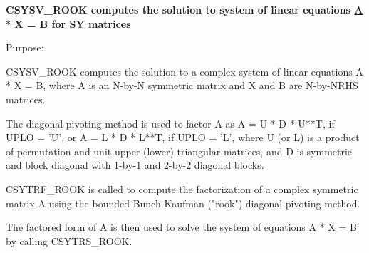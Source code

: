 {\bfseries  C\+S\+Y\+S\+V\+\_\+\+R\+O\+O\+K computes the solution to system of linear equations \hyperlink{classA}{A} $\ast$ X = B for S\+Y matrices} 

 \begin{DoxyParagraph}{Purpose\+: }
\begin{DoxyVerb} CSYSV_ROOK computes the solution to a complex system of linear
 equations
    A * X = B,
 where A is an N-by-N symmetric matrix and X and B are N-by-NRHS
 matrices.

 The diagonal pivoting method is used to factor A as
    A = U * D * U**T,  if UPLO = 'U', or
    A = L * D * L**T,  if UPLO = 'L',
 where U (or L) is a product of permutation and unit upper (lower)
 triangular matrices, and D is symmetric and block diagonal with
 1-by-1 and 2-by-2 diagonal blocks.  

 CSYTRF_ROOK is called to compute the factorization of a complex
 symmetric matrix A using the bounded Bunch-Kaufman ("rook") diagonal
 pivoting method.

 The factored form of A is then used to solve the system 
 of equations A * X = B by calling CSYTRS_ROOK.\end{DoxyVerb}
 
\end{DoxyParagraph}

